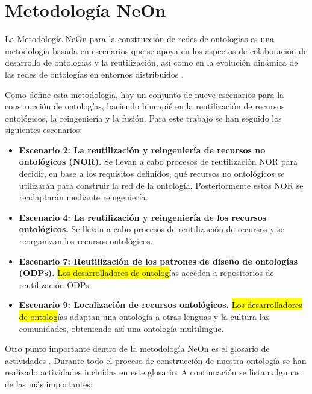 \documentclass[a4paper,12pt]{article}
\begin{document}
	\section{Metodología NeOn}
	
	La Metodología NeOn para la construcción de redes de ontologías es una metodología basada en
escenarios que se apoya en los aspectos de colaboración de desarrollo de ontologías y la
reutilización, así como en la evolución dinámica de las redes de ontologías en entornos
distribuidos
\cite{oeg-neon}.
	
	Como define esta metodología, hay un conjunto de nueve escenarios para la construcción de
ontologías, haciendo hincapié en la reutilización de recursos ontológicos, la reingeniería y la
fusión. Para este trabajo se han seguido los
siguientes escenarios:
	\begin{itemize}
		\item \textbf{Escenario 2: La reutilización y reingeniería de recursos no ontológicos (NOR).}
		Se llevan a cabo procesos de reutilización NOR para decidir, en base a los requisitos definidos, qué recursos no ontológicos se utilizarán para construir la red de la ontología. Posteriormente estos NOR se readaptarán mediante reingeniería.
		\item \textbf{Escenario 4: La reutilización y reingeniería de los recursos ontológicos.}
		Se llevan a cabo procesos de reutilización de recursos y se reorganizan los recursos ontológicos.
		\item \textbf{Escenario 7: Reutilización de los patrones de diseño de ontologías (ODPs).}
		\hl{Los desarrolladores de ontolog}ías acceden a repositorios de reutilización ODPs.
		\item \textbf{Escenario 9: Localización de recursos ontológicos.}
		\hl{Los desarrolladores de ontolog}ías adaptan una ontología a otras lenguas y la cultura las comunidades, obteniendo así una ontología multilingüe.
	\end{itemize}
	
	Otro punto importante dentro de la metodología NeOn es el glosario de actividades \cite{oeg-glossary}. Durante todo el proceso de construcción de
	nuestra ontología se han realizado actividades incluidas en este glosario. A continuación se listan
	algunas de las más importantes:
	
\end{document}
